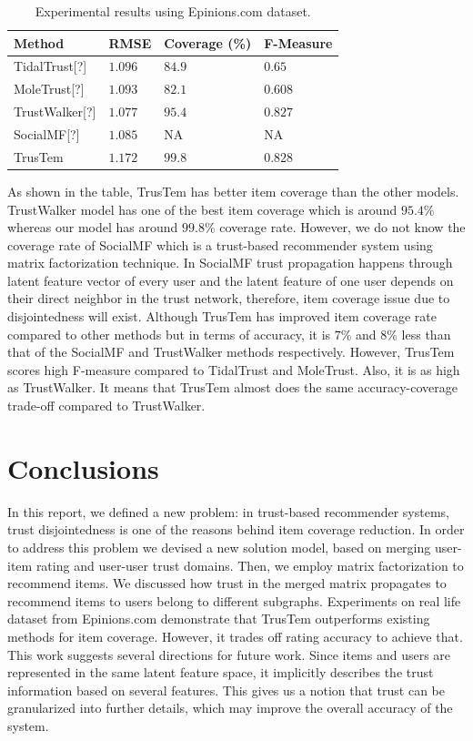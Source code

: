 \documentclass[11pt, conference, onecolumn]{IEEEtran}
\begin{document}
\begin{table}
\centering

\begin{tabular}{|l|l|l|l|}
\hline
\textbf{Method}            & \textbf{RMSE}    & \textbf{Coverage (\%)} & \textbf{F-Measure} \\ \hline \hline
TidalTrust[?]  & $1.096$ & $84.9$        & $0.65$    \\ \hline
MoleTrust[?]   & $1.093$ & $82.1$        & $0.608$   \\ \hline
TrustWalker[?] & $1.077$ & $95.4$        & $0.827$   \\ \hline
SocialMF[?]    & $1.085$ & NA            & NA        \\ \hline
TrusTem     & $1.172$ & $99.8$        & $0.828$   \\ \hline
\end{tabular}
\caption{Experimental results using Epinions.com dataset.}
\label{tab:results}
\end{table}

As shown in the table, TrusTem has better item coverage than the other models. TrustWalker model has one of the best item coverage which is around $95.4\%$ whereas our model has around $99.8\%$ coverage rate. However, we do not know the coverage rate of SocialMF which is a trust-based recommender system using matrix factorization technique. In SocialMF trust propagation happens through latent feature vector of every user and the latent feature of one user depends on their direct neighbor in the trust network, therefore, item coverage issue due to disjointedness will exist. Although TrusTem has improved item coverage rate compared to other methods but in terms of accuracy, it is $7\%$ and $8\%$ less than that of the SocialMF and TrustWalker methods respectively. However, TrusTem scores high F-measure compared to TidalTrust and MoleTrust. Also, it is as high as TrustWalker. It means that TrusTem almost does the same accuracy-coverage trade-off compared to TrustWalker.


\section{Conclusions}
In this report, we defined a new problem: in trust-based recommender systems, trust disjointedness is one of the reasons behind item coverage reduction. In order to address this problem we devised a new solution model, based on merging user-item rating and user-user trust domains. Then, we employ matrix factorization to recommend items. We discussed how trust in the merged matrix propagates to recommend items to users belong to different subgraphs. 
Experiments on real life dataset from Epinions.com demonstrate that TrusTem outperforms existing methods for item coverage. However, it trades off rating accuracy to achieve that. This work suggests several directions for future work. Since items and users are represented in the same latent feature space, it implicitly describes the trust information based on several features. This gives us a notion that trust can be granularized into further details, which may improve the overall accuracy of the system. 
\end{document}
